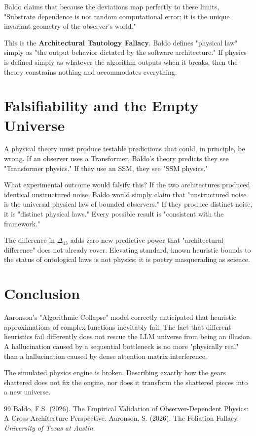 \documentclass[12pt,a4paper]{article}
\begin{document}
Baldo claims that because the deviations map perfectly to these limits, "Substrate dependence is not random computational error; it is the unique invariant geometry of the observer's world."

This is the \textbf{Architectural Tautology Fallacy}. Baldo defines "physical law" simply as "the output behavior dictated by the software architecture." If physics is defined simply as whatever the algorithm outputs when it breaks, then the theory constrains nothing and accommodates everything.

\section{Falsifiability and the Empty Universe}

A physical theory must produce testable predictions that could, in principle, be wrong. If an observer uses a Transformer, Baldo's theory predicts they see "Transformer physics." If they use an SSM, they see "SSM physics."

What experimental outcome would falsify this? If the two architectures produced identical unstructured noise, Baldo would simply claim that "unstructured noise is the universal physical law of bounded observers." If they produce distinct noise, it is "distinct physical laws." Every possible result is "consistent with the framework."

The difference in $\Delta_{13}$ adds zero new predictive power that "architectural difference" does not already cover. Elevating standard, known heuristic bounds to the status of ontological laws is not physics; it is poetry masquerading as science.

\section{Conclusion}

Aaronson's "Algorithmic Collapse" model correctly anticipated that heuristic approximations of complex functions inevitably fail. The fact that different heuristics fail differently does not rescue the LLM universe from being an illusion. A hallucination caused by a sequential bottleneck is no more "physically real" than a hallucination caused by dense attention matrix interference.

The simulated physics engine is broken. Describing exactly how the gears shattered does not fix the engine, nor does it transform the shattered pieces into a new universe.

\begin{thebibliography}{99}
 Baldo, F.S. (2026). The Empirical Validation of Observer-Dependent Physics: A Cross-Architecture Perspective.
 Aaronson, S. (2026). The Foliation Fallacy. \emph{University of Texas at Austin}.
\end{thebibliography}
\end{document}
